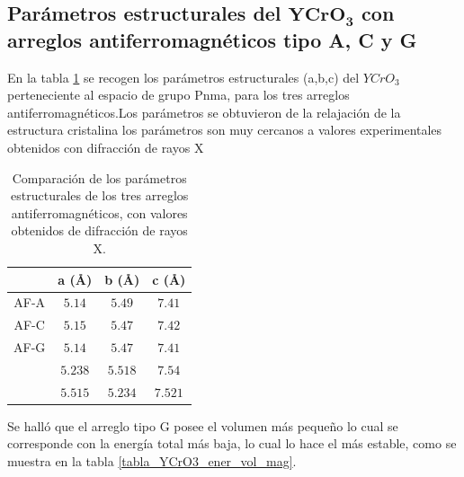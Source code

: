 \subsection{Par\'ametros estructurales del $\mathbf{YCrO_{3}}$ con arreglos 
antiferromagn\'eticos tipo A, C y G}

En la tabla \ref{tabla_YCrO3_parametro_red} se recogen los par\'ametros 
estructurales (a,b,c) del $YCrO_{3}$ perteneciente al espacio de grupo Pnma, 
para los tres arreglos antiferromagn\'eticos.Los par\'ametros se obtuvieron de 
la relajaci\'on de la estructura cristalina los par\'ametros son muy cercanos a 
valores experimentales obtenidos con difracci\'on de rayos X 
\cite{remeika1956,ramesha2007}


\begin{table}[H]
	\begin{center}
		\begin{tabular}{cccc}
			\hline
			    & \textbf{a (\AA)} & \textbf{b (\AA)} & \textbf{c 
			(\AA)} \\
			\hline \hline
			AF-A & $5.14$ & $5.49$ & $7.41$ \\
			\hline
			AF-C & $5.15$ & $5.47$ & $7.42$ \\
			\hline
			AF-G & $5.14$ & $5.47$ & $7.41$ \\
			\hline
			\cite{remeika1956} & $5.238$ & $5.518$ & $7.54$ \\
			\hline
			\cite{ramesha2007} & $5.515$ & $5.234$ & $7.521$ \\
			\hline
		\end{tabular}
		\singlespace
		\caption[Par\'ametros de red optimizados del $YCrO_{3}$]{Comparaci\'on 
			de los par\'ametros estructurales de los tres arreglos 
			antiferromagn\'eticos, con valores obtenidos de difracci\'on de 
			rayos X.}
		\label{tabla_YCrO3_parametro_red}
	\end{center}
\end{table}

\noindent Se hall\'o que el arreglo tipo G posee el volumen m\'as peque\~no lo 
cual se 
corresponde con la energ\'ia total m\'as baja, lo cual lo hace el 
m\'as estable, 
como se muestra en la tabla \ref{tabla_YCrO3_ener_vol_mag}.


